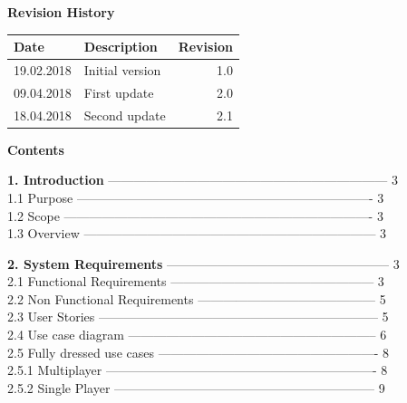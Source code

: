 \documentclass{article}
\begin{document}
	\begin{flushleft}
\textbf{Revision History}\\
\begin{tabular}{|l|l|r|}
	\hline
	Date\hspace{2cm} & Description\hspace{5cm} & Revision \\
	\hline
	19.02.2018 & Initial version & 1.0 \\
	\hline
	09.04.2018 & First update & 2.0 \\
	\hline
	18.04.2018 & Second update & 2.1 \\

	\end{tabular}
\newpage

\begin{Large}\textbf{Contents}\\
\end{Large}
\vspace{5mm}
\textbf{1.	Introduction}  ------------------------------------------------------------------  	 3\\
1.1	\hspace{0.5cm}Purpose  ----------------------------------------------------------------------	 3\\
1.2	\hspace{0.5cm}Scope  -------------------------------------------------------------------------	 3\\
1.3	\hspace{0.5cm}Overview  ---------------------------------------------------------------------	 3\\
\vspace{3mm}

\textbf{2.	System Requirements}  -----------------------------------------------------	 3   \\
2.1	\hspace{0.5cm}Functional Requirements  ------------------------------------------------	 3\\
2.2	\hspace{0.5cm}Non Functional Requirements  ------------------------------------------	 5\\
2.3	\hspace{0.5cm}User Stories  ------------------------------------------------------------------   5\\
2.4	\hspace{0.5cm}Use case diagram  -----------------------------------------------------------	 6\\
2.5	\hspace{0.5cm}Fully dressed use cases  ----------------------------------------------------	8\\
\hspace{0.5cm}2.5.1	Multiplayer  ----------------------------------------------------------------	8\\
\hspace{0.5cm}2.5.2	Single Player  --------------------------------------------------------------	9\\
\vspace{3mm}



\end{flushleft}
\end{document}
